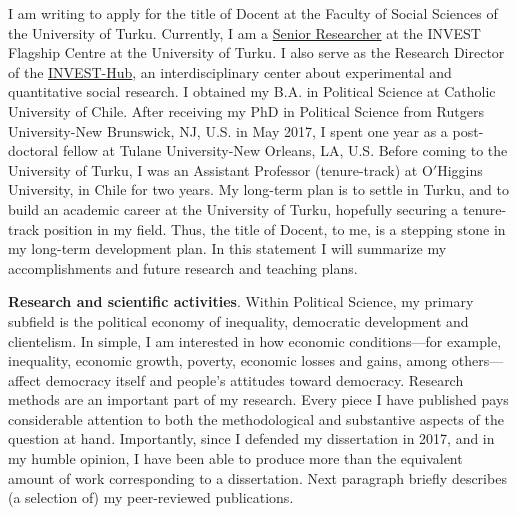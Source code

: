 \documentclass[10pt,stdletter,dateno,sigleft]{newlfm} %
\begin{document}
\begin{newlfm}

\vspace{-0.3cm}I am writing to apply for the title of Docent at the Faculty of Social Sciences of the University of Turku. Currently, I am a \href{https://www.utu.fi/en/people/hector-bahamonde-norambuena}{Senior Researcher} at the INVEST Flagship Centre at the University of Turku. I also serve as the Research Director of the \href{https://www.utu.fi/en/investhub}{INVEST-Hub}, an interdisciplinary center about experimental and quantitative social research. I obtained my B.A. in Political Science at Catholic University of Chile. After receiving my PhD in Political Science from Rutgers University-New Brunswick, NJ, U.S. in May 2017, I spent one year as a post-doctoral fellow at Tulane University-New Orleans, LA, U.S. Before coming to the University of Turku, I was an Assistant Professor (tenure-track) at O$'$Higgins University, in Chile for two years. My long-term plan is to settle in Turku, and to build an academic career at the University of Turku, hopefully securing a tenure-track position in my field. Thus, the title of Docent, to me, is a stepping stone in my long-term development plan. In this statement I will summarize my accomplishments and future research and teaching plans.

{\bf Research and scientific activities}. Within Political Science, my primary subfield is the political economy of inequality, democratic development and clientelism. In simple, I am interested in how economic conditions---for example, inequality, economic growth, poverty, economic losses and gains, among others---affect democracy itself and people's attitudes toward democracy. Research methods are an important part of my research. Every piece I have published pays considerable attention to both the methodological and substantive aspects of the question at hand. Importantly, since I defended my dissertation in 2017, and in my humble opinion, I have been able to produce more than the equivalent amount of work corresponding to a dissertation. Next paragraph briefly describes (a selection of) my peer-reviewed publications.



\end{newlfm}
\end{document}
